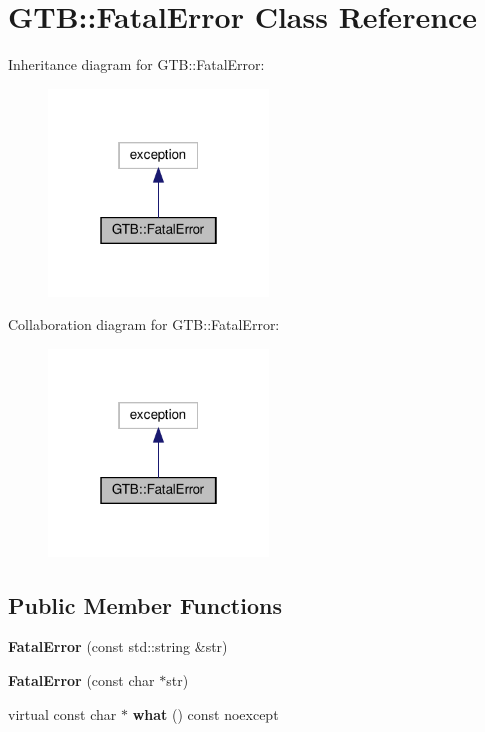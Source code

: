 \hypertarget{a00016}{}\section{G\+TB\+:\+:Fatal\+Error Class Reference}
\label{a00016}


Inheritance diagram for G\+TB\+:\+:Fatal\+Error\+:\nopagebreak
\begin{figure}[H]
\begin{center}
\leavevmode
\includegraphics[width=166pt]{a00015}
\end{center}
\end{figure}


Collaboration diagram for G\+TB\+:\+:Fatal\+Error\+:\nopagebreak
\begin{figure}[H]
\begin{center}
\leavevmode
\includegraphics[width=166pt]{a00014}
\end{center}
\end{figure}
\subsection*{Public Member Functions}
\begin{DoxyCompactItemize}
\item 
\mbox{\label{a00016_add7315c779227e83ff575705aaa8199e}} 
{\bfseries Fatal\+Error} (const std\+::string \&str)
\item 
\mbox{\label{a00016_a217f06adacb94fc8015d1b356110f04a}} 
{\bfseries Fatal\+Error} (const char $\ast$str)
\item 
\mbox{\label{a00016_aa3c9e54856b7fa4787499e796cef745c}} 
virtual const char $\ast$ {\bfseries what} () const noexcept
\end{DoxyCompactItemize}
